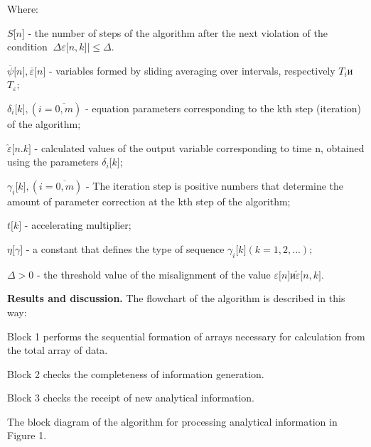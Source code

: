 \begin{multicols}{2}
Where:

\(S\lbrack n\rbrack\) - the number of steps of the algorithm after the
next violation of the condition
\(\left. \ \Delta\varepsilon\lbrack n,k\rbrack \right| \leq \Delta\).

\(\overline{\psi}\lbrack n\rbrack,\overline{\varepsilon}\lbrack n\rbrack\)
- variables formed by sliding averaging over intervals, respectively
\(T_{i}\)и \(T_{\varepsilon}\);

\(\delta_{i}\lbrack k\rbrack,(i = \overline{0,m})\) - equation
parameters corresponding to the kth step (iteration) of the algorithm;

\(\overset{̑}{\varepsilon}\lbrack n.k\rbrack\) - calculated values of the
output variable corresponding to time n, obtained using the parameters
\(\delta_{i}\lbrack k\rbrack\);

\(\gamma_{i}\lbrack k\rbrack,(i = \overline{0,m})\) - The iteration step
is positive numbers that determine the amount of parameter correction at
the kth step of the algorithm;

\(t\lbrack k\rbrack\) - accelerating multiplier;

\(\eta\lbrack\gamma\rbrack\) - a constant that defines the type of
sequence \(\gamma_{i}\lbrack k\rbrack(k = 1,2,...)\);

\(\Delta > 0\) - the threshold value of the misalignment of the value
\(\varepsilon\lbrack n\rbrack и\widetilde{\varepsilon}\lbrack n,k\rbrack\).

{\bfseries Results and discussion.} The flowchart of the algorithm is
described in this way:

Block 1 performs the sequential formation of arrays necessary for
calculation from the total array of data.

Block 2 checks the completeness of information generation.

Block 3 checks the receipt of new analytical information.

The block diagram of the algorithm for processing analytical information
in Figure 1.
\end{multicols}

